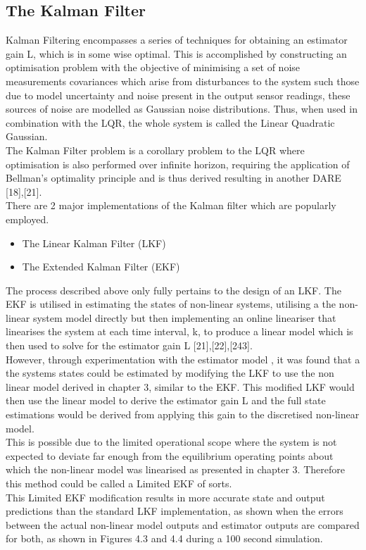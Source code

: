 \documentclass[12pt,a4paper,twoside]{report}
\begin{document}
			\subsection*{The Kalman Filter}
				
				Kalman Filtering encompasses a series of techniques for obtaining an estimator gain L, which is in some wise optimal. This is accomplished by constructing an optimisation problem with the objective of minimising a set of noise measurements covariances which arise from disturbances to the system such those due to model uncertainty and noise present in the output sensor readings, these sources of noise are modelled as Gaussian noise distributions. Thus, when used in combination with the LQR, the whole system is called the Linear Quadratic Gaussian.  
				\\
				The Kalman Filter problem is a corollary problem to the LQR where optimisation is also performed over infinite horizon, requiring the application of Bellman's optimality principle and is thus derived resulting in another DARE [18],[21].
				\\
				There are 2 major implementations of the Kalman filter which are popularly employed.
					
				\begin{itemize}
					\item 
						The Linear Kalman Filter (LKF)
					\item 
						The Extended Kalman Filter (EKF)
				\end{itemize} 
				\space
				The process described above only fully pertains to the design of an LKF. The EKF is utilised in estimating the states of non-linear systems, utilising a the non-linear system model directly but then implementing an online lineariser that linearises the system at each time interval, k, to produce a linear model which is then used to solve for the estimator gain L [21],[22],[243].
				\\
				However, through experimentation with the estimator model , it was found that a the systems states could be estimated by modifying the LKF to use the non linear model derived in chapter 3, similar to the EKF. This modified LKF would then use the linear model to derive the estimator gain L and the full state estimations would be derived from applying this gain to the discretised non-linear model.
				\\
				This is possible due to the limited operational scope where the system is not expected to deviate far enough from the equilibrium operating points about which the non-linear model was linearised as presented in chapter 3. Therefore this method could be called a Limited EKF of sorts.
				\\
				This Limited EKF modification results in more accurate state and output predictions than the standard LKF implementation, as shown when the errors between the actual non-linear model outputs and estimator outputs are compared for both, as shown in Figures 4.3 and 4.4 during a 100 second simulation. 
					
\end{document}
